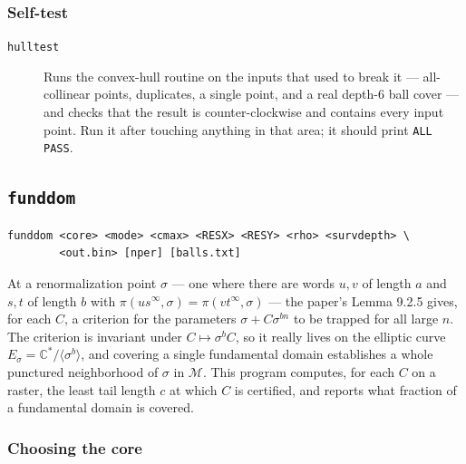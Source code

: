 \documentclass{amsart}
\begin{document}
\subsubsection{Self-test}

\begin{description}
\item[\texttt{hulltest}] Runs the convex-hull routine on the inputs that used to break it ---
all-collinear points, duplicates, a single point, and a real depth-6 ball cover --- and checks
that the result is counter-clockwise and contains every input point.  Run it after touching
anything in that area; it should print \texttt{ALL PASS}.
\end{description}

\subsection{\texttt{funddom}}

\begin{verbatim}
funddom <core> <mode> <cmax> <RESX> <RESY> <rho> <survdepth> \
        <out.bin> [nper] [balls.txt]
\end{verbatim}

At a renormalization point $\sigma$ --- one where there are words $u,v$ of length $a$ and $s,t$
of length $b$ with $\pi(u s^\infty, \sigma) = \pi(v t^\infty, \sigma)$ --- the paper's Lemma
9.2.5 gives, for each $C$, a criterion for the parameters $\sigma + C\sigma^{bn}$ to be trapped
for all large $n$.  The criterion is invariant under $C \mapsto \sigma^b C$, so it really lives on
the elliptic curve $E_\sigma = \mathbb{C}^*/\langle\sigma^b\rangle$, and covering a single
fundamental domain establishes a whole punctured neighborhood of $\sigma$ in $\mathcal{M}$.  This
program computes, for each $C$ on a raster, the least tail length $c$ at which $C$ is certified,
and reports what fraction of a fundamental domain is covered.

\subsubsection{Choosing the core}
\end{document}
